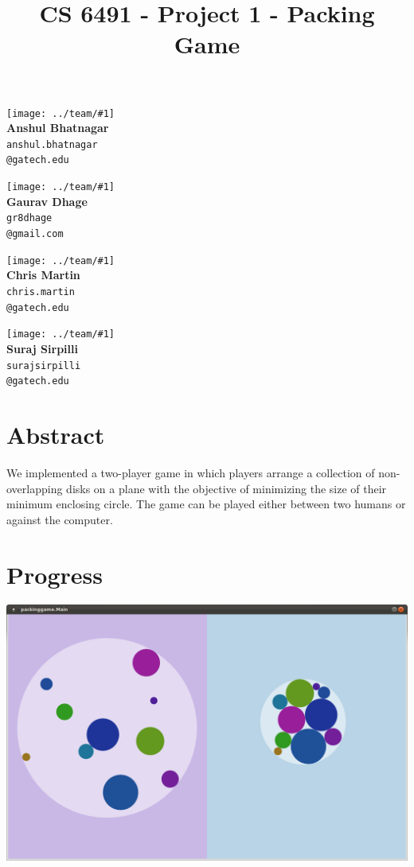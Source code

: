 \documentclass[10pt,twocolumn]{article}
\title{
\vspace{-60pt}
CS 6491 - Project 1 - Packing Game
\vspace{-20pt}
}
\date{}
\begin{document}
\maketitle

  \newcommand\photo[3]{
    \parbox[r]{0.4\linewidth}{
      \centering
      \texttt{[image: ../team/\#1]}
      \\\textbf{#2}\\\texttt{\small#3}
    }
  }
  \photo{anshul}{Anshul Bhatnagar}{anshul.bhatnagar\\@gatech.edu}
  \photo{gaurav}{Gaurav Dhage}{gr8dhage\\@gmail.com}

  \photo{chris}{Chris Martin}{chris.martin\\@gatech.edu}
  \photo{suraj}{Suraj Sirpilli}{surajsirpilli\\@gatech.edu}

\section{Abstract}

We implemented a two-player game in which players arrange a collection
of non-overlapping disks on a plane with the objective of minimizing
the size of their minimum enclosing circle.
The game can be played either between two humans or against the computer.

\section{Progress}

{\centering

\includegraphics[scale=0.2]{screenshot.png}

}
\end{document}
